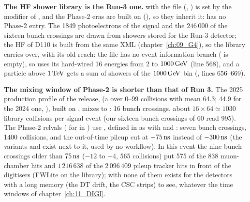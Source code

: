 \textbf{The HF shower library is the Run-3 one.}  with the file
 (, ) is set by the
 modifier of , and the Phase-2 eras are built on 
(), so they inherit it:  has no
Phase-2 entry. The 1849 photoelectrons of the signal and the $246\,000$ of the sixteen bunch crossings are drawn from showers
stored for the Run-3 detector; the HF of D110 is built from the same XML (chapter~\ref{ch:09_G4}), so the library
carries over, with its old reach: the file has no event-information branch ( is empty), so
 uses its hard-wired 16 energies from 2 to $1000\,\mathrm{GeV}$ (line 568), and a
particle above $1\,\mathrm{TeV}$ gets a sum of showers of the $1000\,\mathrm{GeV}$ bin (, lines 656--669).

\textbf{The mixing window of Phase-2 is shorter than that of Run 3.} The 2025 production profile of the release,
 (a  over 0--99
collisions with mean 64.3; 44.9 for the 2024 one, ), built on
, mixes  to
: 16 bunch crossings, about $16\times64 \simeq 1030$ library collisions per signal event (our
sixteen bunch crossings of 60 read 995). The Phase-2 relvals ( for  in
) use , defined in
 as  with  and : seven bunch
crossings, 1400 collisions, and the out-of-time pileup cut at $-75\,\mathrm{ns}$ instead of $-300\,\mathrm{ns}$ (the variants
 and  exist next to it, used by no workflow). In this event the nine
bunch crossings older than $75\,\mathrm{ns}$ ($-12$ to $-4$, 565 collisions) put 575 of the 838 muon-chamber hits and
$1\,216\,638$ of the $2\,096\,409$ pileup tracker hits in front of the digitisers (FWLite on the library); with
 none of them exists for the detectors with a long memory (the DT drift, the CSC strips) to see,
whatever the time windows of chapter~\ref{ch:11_DIGI}.

